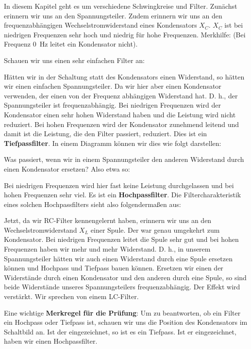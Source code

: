 \begin{ohmchapter}
    In diesem Kapitel geht es um verschiedene Schwingkreise und Filter.
    Zunächst erinnern wir uns an den Spannungsteiler.
    Zudem erinnern wir uns an den frequenzabhängigen Wechselstromwiderstand eines Kondensators $X_C$.
    $X_C$ ist bei niedrigen Frequenzen sehr hoch und niedrig für hohe Frequenzen. Merkhilfe: (Bei Frequenz \SI{0}{\hertz} leitet ein Kondensator nicht).

    Schauen wir uns einen sehr einfachen Filter an:

    Hätten wir in der Schaltung statt des Kondensators einen Widerstand, so hätten wir einen einfachen Spannungsteiler. Da wir hier aber einen Kondensator verwenden, der einen von der Frequenz abhängigen Widerstand hat.
    D. h., der Spannungsteiler ist frequenzabhängig.
    Bei niedrigen Frequenzen wird der Kondensator einen sehr hohen Widerstand haben und die Leistung wird nicht reduziert. Bei hohen Frequenzen wird der Kondensator zunehmend leitend und damit ist die Leistung, die den Filter passiert, reduziert.
    Dies ist ein \textbf{Tiefpassfilter}.
    In einem Diagramm können wir dies wie folgt darstellen:


    Was passiert, wenn wir in einem Spannungsteiler den anderen Widerstand durch einen Kondensator ersetzen?
    Also etwa so:

   Bei niedrigen Frequenzen wird hier fast keine Leistung durchgelassen und bei hohen Frequenzen sehr viel. Es ist ein \textbf{Hochpassfilter}.
   Die Filtercharakteristik eines solchen Hochpassfilters sieht also folgendermaßen aus:


   Jetzt, da wir RC-Filter kennengelernt haben, erinnern wir uns an den Wechselstromwiderstand $X_L$ einer Spule. Der war genau umgekehrt zum Kondensator. Bei niedrigen Frequenzen leitet die Spule sehr gut und bei hohen Frequenzen haben wir mehr und mehr Widerstand.
   D. h., in unserem Spannungsteiler hätten wir auch einen Widerstand durch eine Spule ersetzen können und Hochpass und Tiefpass bauen können.
   Ersetzen wir einen der Widerstände durch einen Kondensator und den anderen durch eine Spule, so sind beide Widerstände unseres Spannungsteilers frequenzabhängig. Der Effekt wird verstärkt. Wir sprechen von einem LC-Filter.

   Eine wichtige \textbf{Merkregel für die Prüfung}:
   Um zu beantworten, ob ein Filter ein Hochpass oder Tiefpass ist, schauen wir uns die Position des Kondensators im Schaltbild an.
   Ist der  eingezeichnet, so ist es ein Tiefpass. Ist er  eingezeichnet, haben wir einen Hochpassfilter.


\end{ohmchapter}
